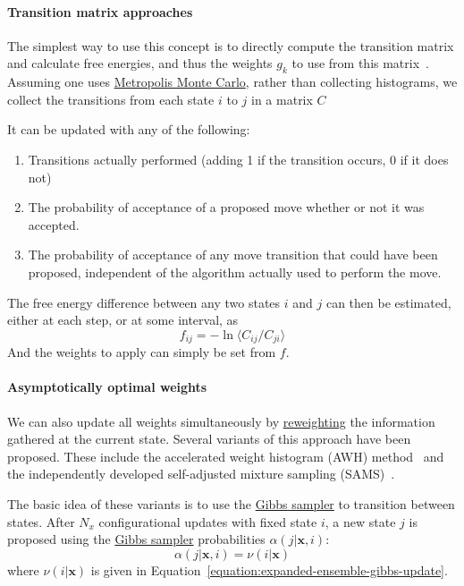 \documentclass[9pt,review]{livecoms}
\newcommand{\vx}{\mathbf{x}}
\begin{document}
\paragraph{Transition matrix approaches}
The simplest way to use this concept is to directly compute the transition matrix and calculate free energies, and thus the weights $g_k$ to use from this matrix~\cite{siderius_2013}. Assuming one uses \hyperlink{ref:MetropolisMonteCarlo} {Metropolis Monte Carlo}, rather than collecting histograms, we collect the transitions from each state $i$ to $j$ in a matrix $C$

It can be updated with any of the following:
\begin{enumerate}
\item Transitions actually performed (adding 1 if the transition occurs, 0 if it does not)\label{item:actual}
\item The probability of acceptance of a proposed move whether or not it was accepted.\label{item:proposal}
\item The probability of acceptance of any move transition that could have been proposed, independent of the algorithm actually used to perform the move. \label{item:transition}
\end{enumerate}

The free energy difference between any two states $i$ and $j$ can then be estimated, either at each step, or at some interval, as
\begin{equation}
f_{ij} = - \ln \langle C_{ij}/C_{ji} \rangle
\label{eq:transitionmc}
\end{equation}
And the weights to apply can simply be set from $f$.

\paragraph{Asymptotically optimal weights}
We can also update all weights simultaneously by \hyperlink{ref:Reweighting} {reweighting} the information gathered at the current state. Several variants of this approach have been proposed. These include the accelerated weight histogram (AWH) method~\cite{Lidmar2012} and the independently developed self-adjusted mixture sampling (SAMS)~\cite{tan_optimally_2017}.

The basic idea of these variants is to use the \hyperlink{ref:GibbsSampler} {Gibbs sampler} to transition between states. After $N_x$ configurational updates with fixed state $i$, a new state $j$ is proposed using the \hyperlink{ref:GibbsSampler} {Gibbs sampler} probabilities $\alpha(j|\vx, i)$:
\begin{equation}\label{eq:gibbsproposal}
  \alpha(j|\vx, i) = \nu(i|\vx)
\end{equation}
where $\nu(i|\vx)$ is given in Equation~\ref{equation:expanded-ensemble-gibbs-update}.
\end{document}
